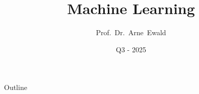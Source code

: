 \documentclass[aspectratio=169]{beamer}
\begin{document}
\graphicspath{{img/}{../includes/}} 

\title[Machine Learning Lecture - NORDAKADEMIE]{Machine Learning}
\author[Prof.\ Dr.\ Arne\ Ewald]{Prof.\ Dr.\ Arne\ Ewald}
\date{Q3 - 2025}



\titleframe{}

\begin{frame}{Outline}
    \tableofcontents
\end{frame}


\end{document}
